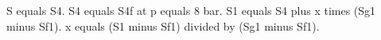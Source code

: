 S equals S4.  
S4 equals S4f at p equals 8 bar.  
S1 equals S4 plus x times (Sg1 minus Sf1).  
x equals (S1 minus Sf1) divided by (Sg1 minus Sf1).
